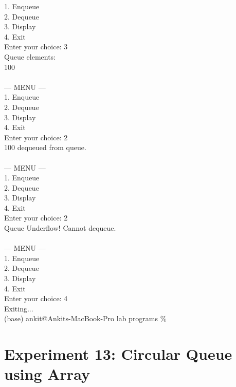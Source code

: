 \documentclass[12pt,a4paper]{article}
\begin{document}
\begin{tcolorbox}[terminalstyle, title=Sample Output]
{1. Enqueue\\
2. Dequeue\\
3. Display\\
4. Exit\\
Enter your choice: 3\\
Queue elements:\\
100\\
\\
--- MENU ---\\
1. Enqueue\\
2. Dequeue\\
3. Display\\
4. Exit\\
Enter your choice: 2\\
100 dequeued from queue.\\
\\
--- MENU ---\\
1. Enqueue\\
2. Dequeue\\
3. Display\\
4. Exit\\
Enter your choice: 2\\
Queue Underflow! Cannot dequeue.\\
\\
--- MENU ---\\
1. Enqueue\\
2. Dequeue\\
3. Display\\
4. Exit\\
Enter your choice: 4\\
Exiting...\\
(base) ankit@Ankits-MacBook-Pro lab programs \%
}
\end{tcolorbox}

\newpage
\section*{Experiment 13: Circular Queue using Array}
\end{document}
